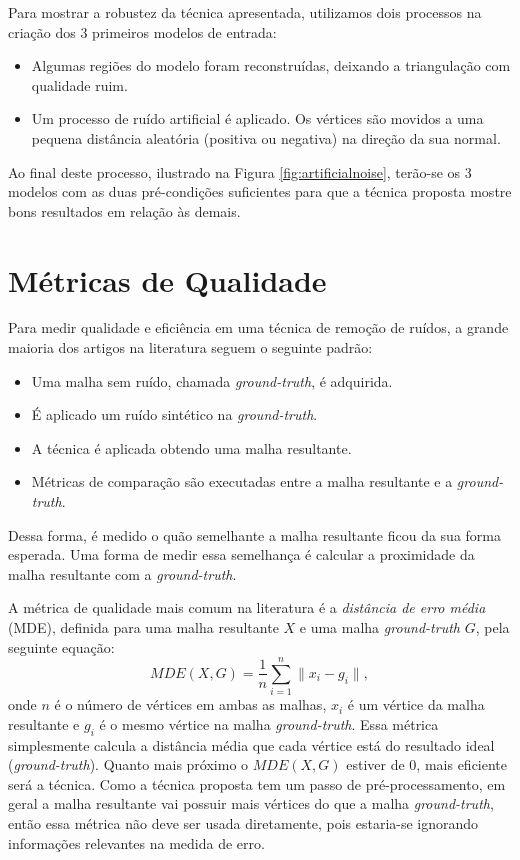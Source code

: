 Para mostrar a robustez da técnica apresentada, utilizamos dois processos na criação dos 3 primeiros modelos de entrada:
\begin{itemize}
    \item Algumas regiões do modelo foram reconstruídas, deixando a triangulação com qualidade ruim.
    \item Um processo de ruído artificial é aplicado. Os vértices são movidos a uma pequena distância aleatória (positiva ou negativa) na direção da sua normal.
\end{itemize}

Ao final deste processo, ilustrado na Figura \ref{fig:artificialnoise}, terão-se os 3 modelos com as duas pré-condições suficientes para que a técnica proposta mostre bons resultados em relação às demais. 

\section{Métricas de Qualidade}\label{metrics}

Para medir qualidade e eficiência em uma técnica de remoção de ruídos, a grande maioria dos artigos na literatura seguem o seguinte padrão:
\begin{itemize}
    \item Uma malha sem ruído, chamada \textit{ground-truth}, é adquirida.
    \item É aplicado um ruído sintético na \textit{ground-truth}.
    \item A técnica é aplicada obtendo uma malha resultante.
    \item Métricas de comparação são executadas entre a malha resultante e a \textit{ground-truth}.
\end{itemize}

Dessa forma, é medido o quão semelhante a malha resultante ficou da sua forma esperada. Uma forma de medir essa semelhança é calcular a proximidade da malha resultante com a \textit{ground-truth}.

A métrica de qualidade mais comum na literatura é a \textit{distância de erro média} (MDE), definida para uma malha resultante $X$ e uma malha \textit{ground-truth} $G$, pela seguinte equação:
\begin{equation}
    MDE(X,G) = \frac{1}{n} \sum_{i=1}^{n}{\|x_i - g_i \|}, 
\end{equation}
onde $n$ é o número de vértices em ambas as malhas, $x_i$ é um vértice da malha resultante e $g_i$ é o mesmo vértice na malha \textit{ground-truth}. Essa métrica simplesmente calcula a distância média que cada vértice está do resultado ideal (\textit{ground-truth}). Quanto mais próximo o $MDE(X,G)$ estiver de $0$, mais eficiente será a técnica. Como a técnica proposta tem um passo de pré-processamento, em geral a malha resultante vai possuir mais vértices do que a malha \textit{ground-truth}, então essa métrica não deve ser usada diretamente, pois estaria-se ignorando informações relevantes na medida de erro.

